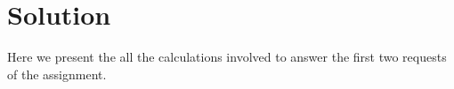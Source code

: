 \section{Solution}
\label{sec:solution}

Here we present the all the calculations involved to answer the first two requests of the assignment.




